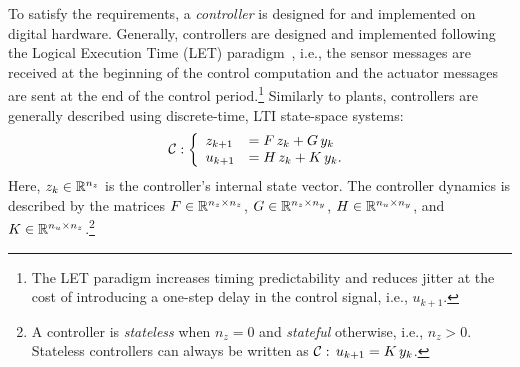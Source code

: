 To satisfy the requirements, a \emph{controller} is designed for and implemented on digital hardware.
Generally, controllers are designed and implemented following the Logical Execution Time (LET) paradigm~\cite{Henzinger:2003}, i.e., the sensor messages are received at the beginning of the control computation and the actuator messages are sent at the end of the control period.\footnote{The LET paradigm increases timing predictability and reduces jitter at the cost of introducing a one-step delay in the control signal, i.e., $u_{k+1}$.}
Similarly to plants, controllers are generally described using discrete-time, LTI state-space systems:
%
\begin{equation}
    \label{eq:ctrler} 
    \ctrler: \left\{\begin{array}{ll}
        z_{k+1} &= \Ac\,z_k+\Bc\,y_k\\
        u_{k+1} &= \Cc\,z_k+\Dc\,y_k.
    \end{array}\right.
\end{equation}
%
Here, $z_k \in \mathbb{R}^{n_z}$ is the controller's internal state vector.
The controller dynamics is described by the matrices $F \in \mathbb{R}^{n_z \times n_z}$, $G \in \mathbb{R}^{n_z \times n_y}$, $H \in \mathbb{R}^{n_u \times n_y}$, and $K \in \mathbb{R}^{n_u \times n_z}$.\footnote{A controller is \emph{stateless} when $n_z=0$ and \emph{stateful} otherwise, i.e., $n_z > 0$. Stateless controllers can always be written as $\mathcal{C}:\, u_{k+1} = K\,y_k$.}

